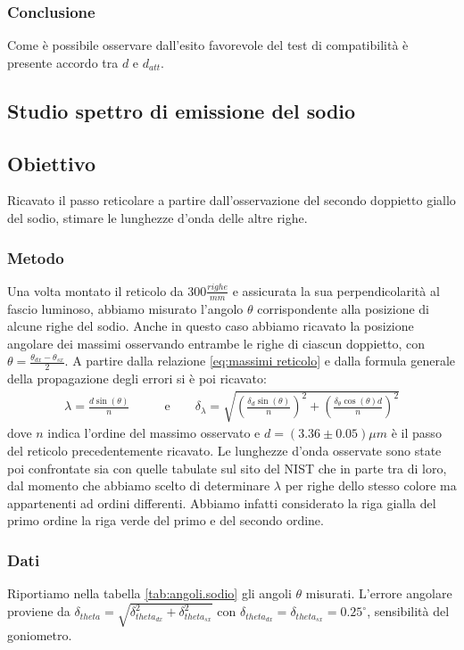\documentclass[a4paper]{article}
\begin{document}
\subsubsection{Conclusione}
Come è possibile osservare dall'esito favorevole del test di compatibilità è presente accordo tra $d$ e $d_{att}$. 

\subsection{Studio spettro di emissione del sodio}
\subsection{Obiettivo}
Ricavato il passo reticolare a partire dall'osservazione del secondo doppietto giallo del sodio, stimare le lunghezze d'onda delle altre righe.

\subsubsection{Metodo}
Una volta montato il reticolo da $300 \frac{righe}{mm}$ e assicurata la sua perpendicolarità al fascio luminoso, abbiamo misurato l'angolo $\theta$ corrispondente alla posizione di alcune righe del sodio. Anche in questo caso abbiamo ricavato la posizione angolare dei massimi osservando entrambe le righe di ciascun doppietto, con $\theta = \frac{\theta_{dx}-\theta_{sx}}{2}$. A partire dalla relazione \ref{eq:massimi reticolo} e dalla formula generale della propagazione degli errori si è poi ricavato:
\begin{align}
    \lambda = \frac{d\sin(\theta)}{n}  \qquad & \text{e} \qquad \delta_{\lambda} = \sqrt{(\frac{\delta_{d}\sin(\theta)}{n})^2 + (\frac{\delta_{\theta}\cos(\theta)d}{n})^2}
\label{eq:lambda_sodio}
\end{align}
dove $n$ indica l'ordine del massimo osservato e $d=(3.36\pm 0.05)\mu m$ è il passo del reticolo precedentemente ricavato.
Le lunghezze d'onda osservate sono state poi confrontate sia con quelle tabulate sul sito del NIST che in parte tra di loro, dal momento che abbiamo scelto di determinare $\lambda$ per righe dello stesso colore ma appartenenti ad ordini differenti. Abbiamo infatti considerato la riga gialla del primo ordine la riga verde del primo e del secondo ordine.

\subsubsection{Dati}
Riportiamo nella tabella \ref{tab:angoli.sodio} gli angoli $\theta$ misurati. L'errore angolare proviene da $\delta_{theta}=\sqrt{\delta_{theta_{dx}}^2+\delta_{theta_{sx}}^2}$ con 
$\delta_{theta_{dx}} =\delta_{theta_{sx}}= 0.25^\circ$, sensibilità del goniometro.
\end{document}
